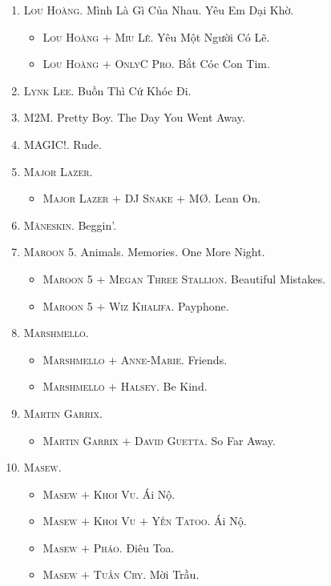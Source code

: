 \documentclass{article}
\begin{document}
\begin{enumerate}
	\item \textsc{Lou Hoàng.} Mình Là Gì Của Nhau. Yêu Em Dại Khờ.
	\begin{itemize}
		\item \textsc{Lou Hoàng $+$ Miu Lê.} Yêu Một Người Có Lẽ.
		\item \textsc{Lou Hoàng $+$ OnlyC Pro.} Bắt Cóc Con Tim.
	\end{itemize}
	\item \textsc{Lynk Lee.} Buồn Thì Cứ Khóc Đi.
	\item \textsc{M2M.} Pretty Boy. The Day You Went Away.
	\item \textsc{MAGIC!.} Rude.
	\item \textsc{Major Lazer.}
	\begin{itemize}
		\item \textsc{Major Lazer $+$ DJ Snake $+$ M\O.} Lean On.
	\end{itemize}
	\item \textsc{M\r{a}neskin.} Beggin'.
	\item \textsc{Maroon 5.} Animals. Memories. One More Night.
	\begin{itemize}
		\item \textsc{Maroon 5 $+$ Megan Three Stallion.} Beautiful Mistakes.
		\item \textsc{Maroon 5 $+$ Wiz Khalifa.} Payphone.
	\end{itemize}
	\item \textsc{Marshmello.}
	\begin{itemize}
		\item \textsc{Marshmello $+$ Anne-Marie.} Friends.
		\item \textsc{Marshmello $+$ Halsey.} Be Kind.
	\end{itemize}
	\item \textsc{Martin Garrix.}
	\begin{itemize}
		\item \textsc{Martin Garrix $+$ David Guetta.} So Far Away.
	\end{itemize}
	\item \textsc{Masew.}
	\begin{itemize}
		\item \textsc{Masew $+$ Khoi Vu.} Ái Nộ.
		\item \textsc{Masew $+$ Khoi Vu $+$ Yến Tatoo.} Ái Nộ.
		\item \textsc{Masew $+$ Pháo.} Điêu Toa.
		\item \textsc{Masew $+$ Tuấn Cry.} Mời Trầu.
	\end{itemize}

\end{enumerate}
\end{document}

